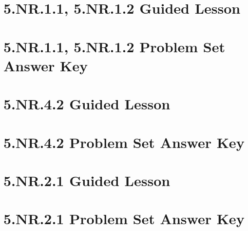 \documentclass[a4paper,12pt]{article}
\title{}
\date{}
\begin{document}


\hypertarget{toc}{}  %
\tableofcontents
\newpage



\pagestyle{fancy}  %
\newpage
\section{5.NR.1.1, 5.NR.1.2 Guided Lesson}


\newpage
\section{5.NR.1.1, 5.NR.1.2 Problem Set Answer Key}


\newpage
\section{5.NR.4.2 Guided Lesson}


\newpage
\section{5.NR.4.2 Problem Set Answer Key}


\newpage
\section{5.NR.2.1 Guided Lesson}


\newpage
\section{5.NR.2.1 Problem Set Answer Key}

\end{document}
